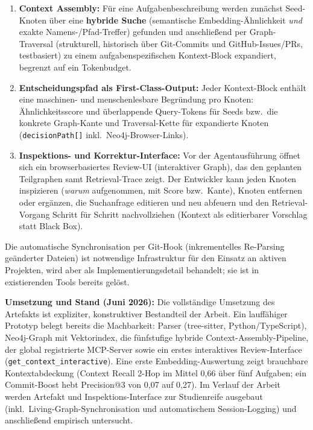 \documentclass[12pt,a4paper]{scrartcl}
\newcommand{\code}[1]{\texttt{#1}}
\begin{document}
\begin{enumerate}[leftmargin=1.6em]
  \item \textbf{Context Assembly:} Für eine Aufgabenbeschreibung werden zunächst Seed-Knoten
    über eine \textbf{hybride Suche} (semantische Embedding-Ähnlichkeit \emph{und} exakte
    Namens-/Pfad-Treffer) gefunden und anschließend per Graph-Traversal (strukturell,
    historisch über Git-Commits und GitHub-Issues/PRs, testbasiert) zu einem
    aufgabenspezifischen Kontext-Block expandiert, begrenzt auf ein Tokenbudget.
  \item \textbf{Entscheidungspfad als First-Class-Output:} Jeder Kontext-Block enthält eine
    maschinen- und menschenlesbare Begründung pro Knoten: Ähnlichkeitsscore und
    überlappende Query-Tokens für Seeds bzw.\ die konkrete Graph-Kante und Traversal-Kette für
    expandierte Knoten (\code{decisionPath[]} inkl.\ Neo4j-Browser-Links).
  \item \textbf{Inspektions- und Korrektur-Interface:} Vor der Agentausführung öffnet sich ein
    browserbasiertes Review-UI (interaktiver Graph), das den geplanten Teilgraphen samt
    Retrieval-Trace zeigt. Der Entwickler kann jeden Knoten inspizieren (\emph{warum}
    aufgenommen, mit Score bzw.\ Kante), Knoten entfernen oder ergänzen, die Suchanfrage
    editieren und neu abfeuern und den Retrieval-Vorgang Schritt für Schritt nachvollziehen
    (Kontext als editierbarer Vorschlag statt Black Box).
\end{enumerate}

Die automatische Synchronisation per Git-Hook (inkrementelles Re-Parsing geänderter Dateien)
ist notwendige Infrastruktur für den Einsatz an aktiven Projekten, wird aber als
Implementierungsdetail behandelt; sie ist in existierenden Tools bereits gelöst.

\noindent\textbf{Umsetzung und Stand (Juni 2026):} Die vollständige Umsetzung des Artefakts ist
expliziter, konstruktiver Bestandteil der Arbeit. Ein lauffähiger Prototyp belegt bereits die
Machbarkeit: Parser (tree-sitter, Python/TypeScript), Neo4j-Graph mit Vektorindex, die
fünfstufige hybride Context-Assembly-Pipeline, der global registrierte MCP-Server sowie ein
erstes interaktives Review-Interface (\code{get\_context\_interactive}). Eine erste
Embedding-Auswertung zeigt brauchbare Kontextabdeckung (Context Recall 2-Hop im Mittel
0,66 über fünf Aufgaben; ein Commit-Boost hebt Precision@3 von 0,07 auf 0,27). Im Verlauf der
Arbeit werden Artefakt und Inspektions-Interface zur Studienreife ausgebaut (inkl.\
Living-Graph-Synchronisation und automatischem Session-Logging) und anschließend empirisch
untersucht.
\end{document}

